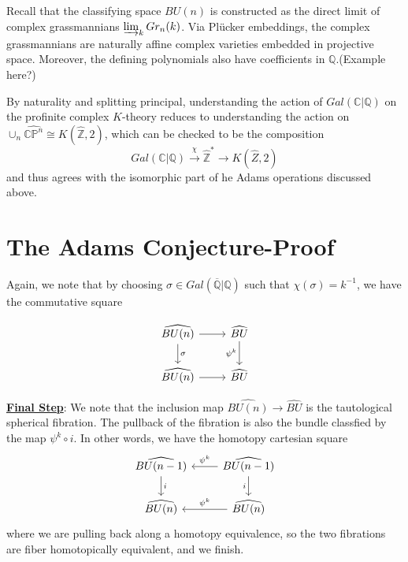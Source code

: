 \documentclass{article}
\theoremstyle{definition}
\theoremstyle{definition}
\theoremstyle{definition}
\theoremstyle{definition}
\theoremstyle{definition}
\theoremstyle{definition}
\theoremstyle{definition}
\begin{document}
Recall that the classifying space $BU(n)$ is constructed as the direct limit of complex grassmannians $\varinjlim_{k}Gr_n(k)$. Via Pl\"{u}cker embeddings, the complex grassmannians are naturally affine complex varieties embedded in projective space. Moreover, the defining polynomials also have coefficients in $\mathbb{Q}$.(Example here?)


By naturality and splitting principal, understanding the action of $Gal(\mathbb{C}|\mathbb{Q})$ on the profinite complex $K$-theory reduces to understanding the action on $\cup_n \widehat{\mathbb{CP}^n}\cong K(\widehat{\mathbb{Z}},2)$, which can be checked to be the composition 
\[Gal(\mathbb{C}|\mathbb{Q})\xrightarrow{\chi} \widehat{\mathbb{Z}}^*\to K(\widehat{Z},2)\]
and thus agrees with the isomorphic part of he Adams operations discussed above. 

\section{The Adams Conjecture-Proof}
Again, we note that by choosing $\sigma\in Gal(\overline{\mathbb{Q}}|\mathbb{Q})$ such that $\chi(\sigma)=k^{-1}$, we have the commutative square

\[\begin{tikzcd}
	{\widehat{BU(n)}} & {\widehat{BU}} \\
	{\widehat{BU(n)}} & {\widehat{BU}}
	\arrow[from=1-1, to=1-2]
	\arrow["\sigma", from=1-1, to=2-1]
	\arrow["{\psi^k}"', from=1-2, to=2-2]
	\arrow[from=2-1, to=2-2]
\end{tikzcd}\]

\underline{\textbf{Final Step}}: We note that the inclusion map $\widehat{BU(n)}\to \widehat{BU}$ is the tautological spherical fibration. The pullback of the fibration is also the bundle classfied by the map $\psi^k\circ i$. In other words, we have the homotopy cartesian square 
\[\begin{tikzcd}
	{\widehat{BU(n-1)}} & {\widehat{BU(n-1)}} \\
	{\widehat{BU(n)}} & {\widehat{BU(n)}}
	\arrow["i", from=1-1, to=2-1]
	\arrow["{\psi^k}"', from=1-2, to=1-1]
	\arrow["i"', from=1-2, to=2-2]
	\arrow["{\psi^k}"', from=2-2, to=2-1]
\end{tikzcd}\]
where we are pulling back along a homotopy equivalence, so the two fibrations are fiber homotopically equivalent, and we finish. 
\end{document}
